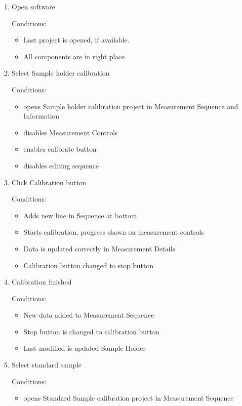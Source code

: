 \begin{enumerate}

\item Open software

Conditions:
\begin{itemize}
\item Last project is opened, if available.
\item All components are in right place
\end{itemize}

\item Select Sample holder calibration

Conditions:
\begin{itemize}
\item opens Sample holder calibration project in Measurement Sequence and Information
\item disables Measurement Controls
\item enables calibrate button
\item disables editing sequence
\end{itemize}

\item Click Calibration button

Conditions:
\begin{itemize}
\item Adds new line in Sequence at bottom
\item Starts calibration, progress shown on measurement controls
\item Data is updated correctly in Measurement Details
\item Calibration button changed to stop button
\end{itemize}

\item Calibration finished

Conditions:
\begin{itemize}
\item New data added to Measurement Sequence
\item Stop button is changed to calibration button
\item Last modified is updated Sample Holder
\end{itemize}

\item Select standard sample

Conditions:
\begin{itemize}
\item opens Standard Sample calibration project in Measurement Sequence
\end{itemize}


\end{enumerate}
